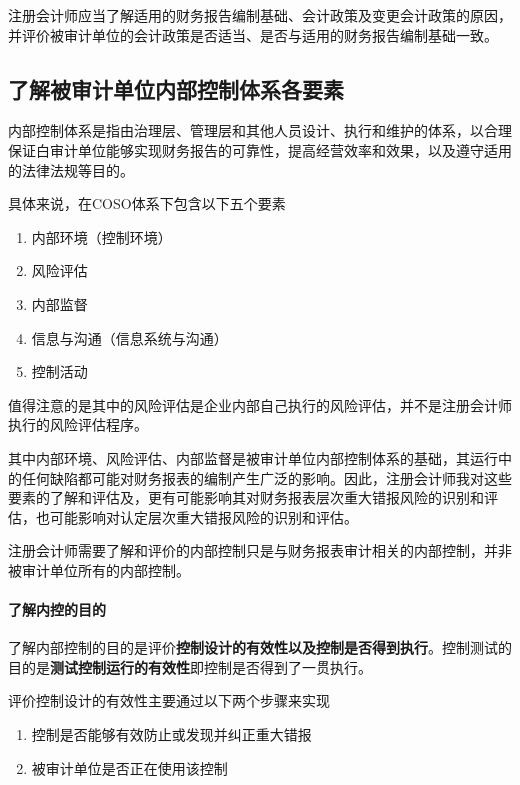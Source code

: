\documentclass[UTF8,12pt]{ctexart}
\numberwithin{equation}{section} %
\numberwithin{figure}{section}
\numberwithin{table}{section}
\begin{document}
	注册会计师应当了解适用的财务报告编制基础、会计政策及变更会计政策的原因，并评价被审计单位的会计政策是否适当、是否与适用的财务报告编制基础一致。
	
	\subsection{了解被审计单位内部控制体系各要素}
	内部控制体系是指由治理层、管理层和其他人员设计、执行和维护的体系，以合理保证白审计单位能够实现财务报告的可靠性，提高经营效率和效果，以及遵守适用的法律法规等目的。
	
	具体来说，在COSO体系下包含以下五个要素
	\begin{enumerate}
		\item 内部环境（控制环境）
		
		\item 风险评估
		
		\item 内部监督
		
		\item 信息与沟通（信息系统与沟通）
		
		\item 控制活动
	\end{enumerate}
	值得注意的是其中的风险评估是企业内部自己执行的风险评估，并不是注册会计师执行的风险评估程序。
	
	其中内部环境、风险评估、内部监督是被审计单位内部控制体系的基础，其运行中的任何缺陷都可能对财务报表的编制产生广泛的影响。因此，注册会计师我对这些要素的了解和评估及，更有可能影响其对财务报表层次重大错报风险的识别和评估，也可能影响对认定层次重大错报风险的识别和评估。
	
	注册会计师需要了解和评价的内部控制只是与财务报表审计相关的内部控制，并非被审计单位所有的内部控制。
	
	\paragraph{了解内控的目的}了解内部控制的目的是评价\textbf{控制设计的有效性以及控制是否得到执行}。控制测试的目的是\textbf{测试控制运行的有效性}即控制是否得到了一贯执行。
	
	评价控制设计的有效性主要通过以下两个步骤来实现
	\begin{enumerate}
		\item 控制是否能够有效防止或发现并纠正重大错报
		
		\item 被审计单位是否正在使用该控制
	\end{enumerate}
	
\end{document}
